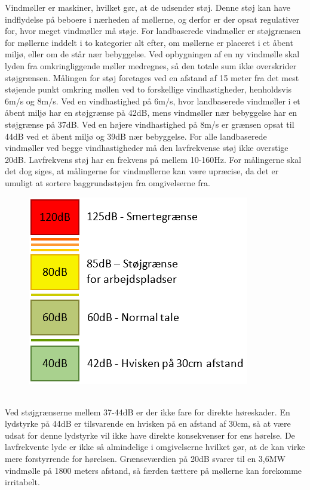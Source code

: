 Vindmøller er maskiner, hvilket gør, at de udsender støj. Denne støj kan have indflydelse på beboere i nærheden af møllerne, og derfor er der opsat regulativer for, hvor meget vindmøller må støje. For landbaserede vindmøller er støjgrænsen for møllerne inddelt i to kategorier alt efter, om møllerne er placeret i et åbent miljø, eller om de står nær bebyggelse. Ved opbygningen af en ny vindmølle skal lyden fra omkringliggende møller medregnes, så den totale sum ikke overskrider støjgrænsen. Målingen for støj foretages ved en afstand af 15 meter fra det mest støjende punkt omkring møllen ved to forskellige vindhastigheder, henholdsvis 6m/s og 8m/s. Ved en vindhastighed på 6m/s, hvor landbaserede vindmøller i et åbent miljø har en støjgrænse på 42dB, mens vindmøller nær bebyggelse har en støjgrænse på 37dB. Ved en højere vindhastighed på 8m/s er grænsen opsat til 44dB ved et åbent miljø og 39dB nær bebyggelse. For alle landbaserede vindmøller ved begge vindhastigheder må den lavfrekvense støj ikke overstige 20dB. Lavfrekvens støj har en frekvens på mellem 10-160Hz. %
For målingerne skal det dog siges, at målingerne for vindmøllerne kan være upræcise, da det er umuligt at sortere baggrundsstøjen fra omgivelserne fra. \\
\begin{figure}
\includegraphics[scale=1]{Billeder/Stoejgraenser}
\end{figure}
\\
Ved støjgrænserne mellem 37-44dB er der ikke fare for direkte høreskader. En lydstyrke på 44dB er tilsvarende en hvisken på en afstand af 30cm, så at være udsat for denne lydstyrke vil ikke have direkte konsekvenser for ens hørelse. De lavfrekvente lyde er ikke så almindelige i omgivelserne hvilket gør, at de kan virke mere forstyrrende for hørelsen. Grænseværdien på 20dB svarer til en 3,6MW vindmølle på 1800 meters afstand, så færden tættere på møllerne kan forekomme irritabelt. %
\\

